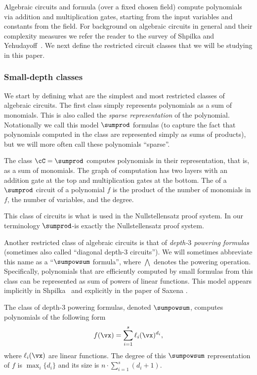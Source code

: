 \documentclass{toc}
\begin{document}
Algebraic circuits and formula (over a fixed chosen field) compute polynomials via addition and multiplication gates, starting from the input variables and constants from the field. For background on algebraic circuits in general and their complexity measures we refer the reader to the survey of Shpilka and Yehudayoff~\cite{SY10}. We next define the restricted circuit classes that we will be studying in this paper.

\subsubsection{Small-depth classes}

We start by defining what are the simplest and most restricted classes of algebraic circuits. The first class simply represents polynomials as a sum of monomials. This is also called the \emph{sparse representation} of the polynomial. Notationally we call this model $\sumprod$ formulas (to capture the fact that polynomials computed in the class are represented simply as sums of products), but we will more often call these polynomials ``sparse''.

\begin{definition}\label{def:sparse}
        The class $\cC=\sumprod$ computes polynomials in their  representation, that is, as a sum of monomials. The graph of computation has two layers with an addition gate at the top and multiplication gates at the bottom. The  of a $\sumprod$ circuit of a polynomial $f$ is the product of the number of monomials in $f$, the number of variables, and the degree.
\end{definition}

This class of circuits is what is used in the Nullstellensatz proof system. In our terminology $\sumprod$-\lIPS is exactly the Nullstellensatz proof system.

Another restricted class of algebraic circuits is that of \emph{depth-$3$ powering formulas} (sometimes also called ``diagonal depth-$3$ circuits''). We will sometimes abbreviate this name as a ``$\sumpowsum$ formula'', where $\bigwedge$ denotes the powering operation. Specifically, polynomials that are efficiently computed by small formulas from this class can be represented as sum of powers of linear functions. This model appears implicitly in Shpilka~\cite{Shpilka02} and explicitly in the paper of Saxena \cite{Saxena08}.

\begin{definition}\label{def:diagonal}
        The class of depth-$3$ powering formulas, denoted $\sumpowsum$, computes polynomials of the following form $$f(\vx)=\sum_{i=1}^{s} \ell_i(\vx)^{d_i},$$ where $\ell_i(\vx)$ are linear functions. The degree of this $\sumpowsum$ representation of $f$ is $\max_i\{d_i\}$ and its size  is $n\cdot \sum_{i=1}^{s}(d_i+1)$.
\end{definition}
\end{document}
